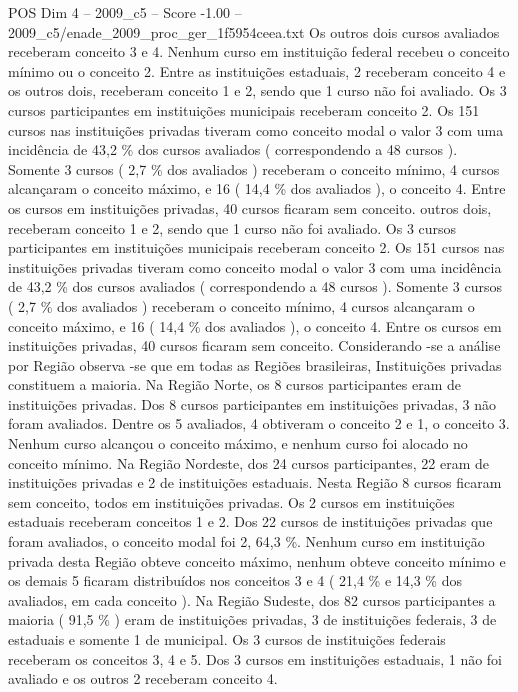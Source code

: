 \begin{textsample}{POS Dim 4 – 2009\_c5 – Score -1.00 – 2009\_c5/enade\_2009\_proc\_ger\_1f5954ceea.txt}
Os outros dois cursos avaliados receberam conceito 3 e 4.
Nenhum curso em instituição federal recebeu o conceito mínimo ou o conceito 2.
Entre as instituições estaduais, 2 receberam conceito 4 e os outros dois, receberam conceito 1 e 2, sendo que 1 curso não foi avaliado.
Os 3 cursos participantes em instituições municipais receberam conceito 2.
Os 151 cursos nas instituições privadas tiveram como conceito modal o valor 3 com uma incidência de 43,2 \% dos cursos avaliados ( correspondendo a 48 cursos ).
Somente 3 cursos ( 2,7 \% dos avaliados ) receberam o conceito mínimo, 4 cursos alcançaram o conceito máximo, e 16 ( 14,4 \% dos avaliados ), o conceito 4.
Entre os cursos em instituições privadas, 40 cursos ficaram sem conceito. outros dois, receberam conceito 1 e 2, sendo que 1 curso não foi avaliado.
Os 3 cursos participantes em instituições municipais receberam conceito 2.
Os 151 cursos nas instituições privadas tiveram como conceito modal o valor 3 com uma incidência de 43,2 \% dos cursos avaliados ( correspondendo a 48 cursos ).
Somente 3 cursos ( 2,7 \% dos avaliados ) receberam o conceito mínimo, 4 cursos alcançaram o conceito máximo, e 16 ( 14,4 \% dos avaliados ), o conceito 4.
Entre os cursos em instituições privadas, 40 cursos ficaram sem conceito.
Considerando -se a análise por Região observa -se que em todas as Regiões brasileiras, Instituições privadas constituem a maioria.
Na Região Norte, os 8 cursos participantes eram de instituições privadas.
Dos 8 cursos participantes em instituições privadas, 3 não foram avaliados.
Dentre os 5 avaliados, 4 obtiveram o conceito 2 e 1, o conceito 3.
Nenhum curso alcançou o conceito máximo, e nenhum curso foi alocado no conceito mínimo.
Na Região Nordeste, dos 24 cursos participantes, 22 eram de instituições privadas e 2 de instituições estaduais.
Nesta Região 8 cursos ficaram sem conceito, todos em instituições privadas.
Os 2 cursos em instituições estaduais receberam conceitos 1 e 2.
Dos 22 cursos de instituições privadas que foram avaliados, o conceito modal foi 2, 64,3 \%.
Nenhum curso em instituição privada desta Região obteve conceito máximo, nenhum obteve conceito mínimo e os demais 5 ficaram distribuídos nos conceitos 3 e 4 ( 21,4 \% e 14,3 \% dos avaliados, em cada conceito ).
Na Região Sudeste, dos 82 cursos participantes a maioria ( 91,5 \% ) eram de instituições privadas, 3 de instituições federais, 3 de estaduais e somente 1 de municipal.
Os 3 cursos de instituições federais receberam os conceitos 3, 4 e 5.
Dos 3 cursos em instituições estaduais, 1 não foi avaliado e os outros 2 receberam conceito 4.

\end{textsample}
